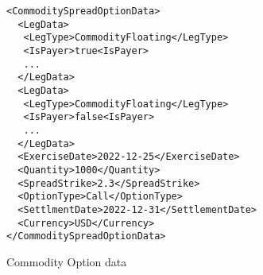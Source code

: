 \begin{listing}[H]
    \begin{verbatim}
<CommoditySpreadOptionData>
  <LegData>
   <LegType>CommodityFloating</LegType>
   <IsPayer>true<IsPayer>
   ...
  </LegData>
  <LegData>
   <LegType>CommodityFloating</LegType>
   <IsPayer>false<IsPayer>
   ...
  </LegData>
  <ExerciseDate>2022-12-25</ExerciseDate>
  <Quantity>1000</Quantity>
  <SpreadStrike>2.3</SpreadStrike>
  <OptionType>Call</OptionType>
  <SettlmentDate>2022-12-31</SettlementDate>
  <Currency>USD</Currency>
</CommoditySpreadOptionData>
    \end{verbatim}
    \caption{Commodity Option data}
    \label{lst:com_s_option_data}
\end{listing}
